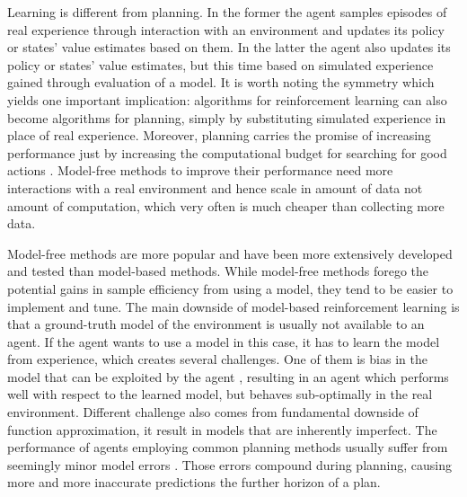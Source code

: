 Learning is different from planning. In the former the agent samples episodes of real experience through interaction with an environment and updates its policy or states' value estimates based on them. In the latter the agent also updates its policy or states' value estimates, but this time based on simulated experience gained through evaluation of a model. It is worth noting the symmetry which yields one important implication: algorithms for reinforcement learning can also become algorithms for planning, simply by substituting simulated experience in place of real experience. Moreover, planning carries the promise of increasing performance just by increasing the computational budget for searching for good actions \cite{Algo.AlphaGoZero}. Model-free methods to improve their performance need more interactions with a real environment and hence scale in amount of data not amount of computation, which very often is much cheaper than collecting more data.

Model-free methods are more popular and have been more extensively developed and tested than model-based methods. While model-free methods forego the potential gains in sample efficiency from using a model, they tend to be easier to implement and tune. The main downside of model-based reinforcement learning is that a ground-truth model of the environment is usually not available to an agent. If the agent wants to use a model in this case, it has to learn the model from experience, which creates several challenges. One of them is bias in the model that can be exploited by the agent \cite{Algo.WorldModels}, resulting in an agent which performs well with respect to the learned model, but behaves sub-optimally in the real environment. Different challenge also comes from fundamental downside of function approximation, it result in models that are inherently imperfect. The performance of agents employing common planning methods usually suffer from seemingly minor model errors \cite{Study.ModelErrorinMC}. Those errors compound during planning, causing more and more inaccurate predictions the further horizon of a plan. 

